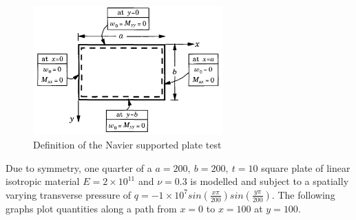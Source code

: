 \begin{figure}[H]
	\centering
	\def\svgwidth{\columnwidth}
	\includegraphics[width=7.3cm]{images/navier_plate_def.png}
	\caption{Definition of the Navier supported plate test \cite{reddy2004mechanics}}
	\label{validation:pic navier plate}
\end{figure}

Due to symmetry, one quarter of a $a = 200,\ b = 200,\ t = 10$ square plate of linear isotropic material $E = 2\times 10^{11}$ and $\nu = 0.3$ is modelled and subject to a spatially varying transverse pressure of $q = -1\times 10^7 sin(\frac{x\pi}{200})sin(\frac{y\pi}{200})$. The following graphs plot quantities along a path from $x=0$ to $x=100$ at $y=100$.


